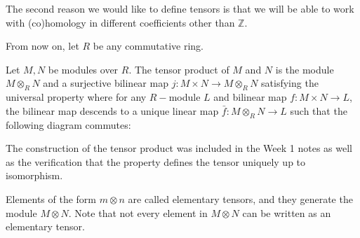 \documentclass[12pt,reqno]{amsart}
\numberwithin{theorem}{section}
\theoremstyle{definition}
\theoremstyle{remark}
\numberwithin{equation}{section}
\newcommand{\Z}{\mathbb Z}
\theoremstyle{definition}
\begin{document}
The second reason we would like to define tensors is that we will be able to work with (co)homology in different coefficients other than $\Z$.

From now on, let $R$ be any commutative ring. 
\begin{definition}
    Let $M, N$ be modules over $R$. The tensor product of $M$ and $N $ is the module $M \otimes_RN$ and a surjective bilinear map $j:M\times N\rightarrow M\otimes_R N$ satisfying the universal property where for any $R-$module $L$ and bilinear map $f:M\times N \rightarrow L$, the bilinear map descends to a unique linear map $\bar f:M\otimes_RN \rightarrow L$ such that the following diagram commutes:
    \begin{center}
    \end{center}
\end{definition}
The construction of the tensor product was included in the Week 1 notes as well as the verification that the property defines the tensor uniquely up to isomorphism. 

Elements of the form $m\otimes n$ are called elementary tensors, and they generate the module $M\otimes N$. Note that not every element in $M\otimes N$ can be written as an elementary tensor.
\end{document}
